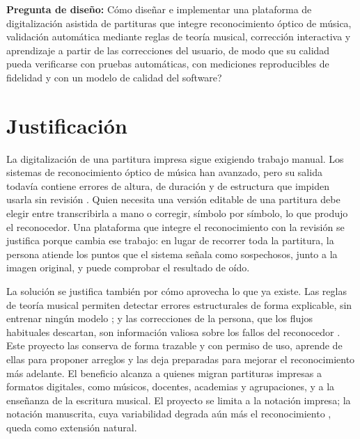 \documentclass[conference]{IEEEtran}
\begin{document}
\textbf{Pregunta de diseño:} \textquestiondown Cómo diseñar e implementar
una plataforma de digitalización asistida de partituras que integre
reconocimiento óptico de música, validación automática mediante reglas de
teoría musical, corrección interactiva y aprendizaje a partir de las
correcciones del usuario, de modo que su calidad pueda verificarse con
pruebas automáticas, con mediciones reproducibles de fidelidad y con un
modelo de calidad del software?

\section{Justificación}
La digitalización de una partitura impresa sigue exigiendo trabajo manual.
Los sistemas de reconocimiento óptico de música han avanzado, pero su
salida todavía contiene errores de altura, de duración y de estructura que
impiden usarla sin revisión \cite{rebelo2012,calvo2018}. Quien necesita una
versión editable de una partitura debe elegir entre transcribirla a mano o
corregir, símbolo por símbolo, lo que produjo el reconocedor. Una
plataforma que integre el reconocimiento con la revisión se justifica
porque cambia ese trabajo: en lugar de recorrer toda la partitura, la
persona atiende los puntos que el sistema señala como sospechosos, junto a
la imagen original, y puede comprobar el resultado de oído.

La solución se justifica también por cómo aprovecha lo que ya existe. Las
reglas de teoría musical permiten detectar errores estructurales de forma
explicable, sin entrenar ningún modelo \cite{cuthbert2010}; y las
correcciones de la persona, que los flujos habituales descartan, son
información valiosa sobre los fallos del reconocedor \cite{amershi2014}.
Este proyecto las conserva de forma trazable y con permiso de uso, aprende
de ellas para proponer arreglos y las deja preparadas para mejorar el
reconocimiento más adelante. El beneficio alcanza a quienes migran
partituras impresas a formatos digitales, como músicos, docentes,
academias y agrupaciones, y a la enseñanza de la escritura musical. El
proyecto se limita a la notación impresa; la notación manuscrita, cuya
variabilidad degrada aún más el reconocimiento \cite{ricordi2024}, queda
como extensión natural.
\end{document}

